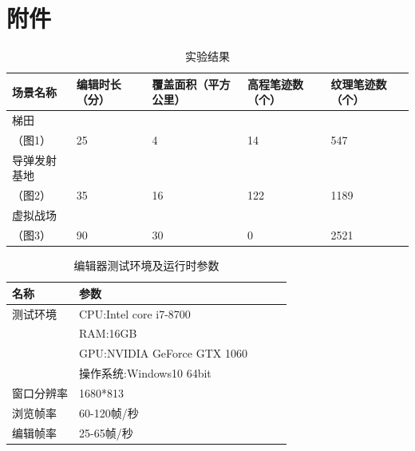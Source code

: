
\chapter{附件}
\begin{table}[h]
\caption{实验结果}
\begin{tabularx}{17cm}{lllll}
\hline
场景名称   & 编辑时长（分）  & 覆盖面积（平方公里） &高程笔迹数（个）&纹理笔迹数（个）\\
\hline
梯田\\（图1）     & 25 & 4  & 14 & 547            \\
\hline
导弹发射基地\\（图2） & 35 & 16  & 122 & 1189     \\
\hline
虚拟战场\\（图3）   & 90 & 30    & 0  & 2521     \\
\hline
\end{tabularx}
\end{table}

\begin{table}[h]
\caption{编辑器测试环境及运行时参数}
\begin{tabularx}{17cm}{lllll}
\hline
名称&参数 \\
\hline
测试环境&CPU:Intel core i7-8700\\&RAM:16GB\\&GPU:NVIDIA GeForce GTX 1060            \\&操作系统:Windows10 64bit \\
\hline
窗口分辨率&   1680*813 \\
\hline
浏览帧率& 60-120帧/秒     \\
\hline
编辑帧率&25-65帧/秒    \\
\hline

\end{tabularx}
\end{table}


